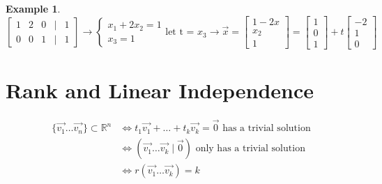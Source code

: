 \documentclass{article}
\newtheorem{ex}[theorem]{Example}
\begin{document}
\begin{ex}
\[\begin{bmatrix} 1 & 2 & 0 & \mid & 1 \\ 0 & 0 & 1 & \mid & 1 \end{bmatrix} \rightarrow \begin{cases} x_1 + 2x_2 = 1 \\ x_3 = 1\end{cases} \text{let t = } x_3 \rightarrow \vec{x} = \begin{bmatrix} 1 - 2x \\ x_2 \\ 1 \end{bmatrix} = \begin{bmatrix}1 \\ 0 \\ 1 \end{bmatrix} + t \begin{bmatrix} -2 \\ 1 \\ 0\end{bmatrix} \]
\end{ex}

\section{Rank and Linear Independence}
\[ \begin{aligned} \{ \vec{v_1} \ldots \vec{v_n} \} \subset \mathbb{R}^n & \iff t_1\vec{v_1} + \ldots + t_k\vec{v_k} = \vec{0}\text{ has a trivial solution} \\
& \iff (\vec{v_1} \ldots \vec{v_k} \mid \vec{0}) \text{ only has a trivial solution } \\
& \iff r(\vec{v_1} \ldots \vec{v_k}) = k  \end{aligned} \]
 
\newpage
\end{document}
